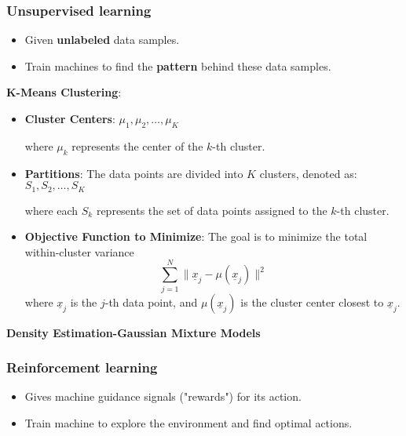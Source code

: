     \subsubsection{Unsupervised learning}
    \begin{definition}
        \begin{itemize}
            \item Given \textbf{unlabeled} data samples.
            \item Train machines to find the \textbf{pattern} behind these data samples.
        \end{itemize}
    \end{definition}

    \begin{example}
        \textbf{K-Means Clustering}:

            \begin{itemize}
                \item \textbf{Cluster Centers}: $\mu_1, \mu_2, \dots, \mu_K$
                
                where \( \mu_k \) represents the center of the \( k \)-th cluster.
                
                \item \textbf{Partitions}: 
                The data points are divided into \( K \) clusters, denoted as: $S_1, S_2, \dots, S_K$

                where each \( S_k \) represents the set of data points assigned to the \( k \)-th cluster.
                
                \item \textbf{Objective Function to Minimize}:
                The goal is to minimize the total within-cluster variance
                \[
                \sum_{j=1}^{N} \| \underline{x}_j - \mu(\underline{x}_j) \|^2
                \]
                where \( \underline{x}_j \) is the \( j \)-th data point, and \( \mu(\underline{x}_j) \) is the cluster center closest to \( \underline{x}_j \).
            \end{itemize}
        \textbf{Density Estimation-Gaussian Mixture Models}
    \end{example}

    \subsubsection{Reinforcement learning}
    \begin{definition}
        \begin{itemize}
            \item Gives machine guidance signals ("rewards") for its action.
            \item Train machine to explore the environment and find optimal actions.
        \end{itemize}
    \end{definition}

